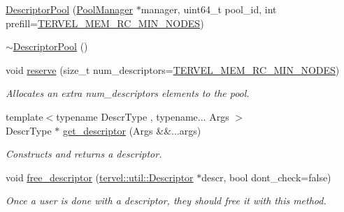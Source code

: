 \begin{DoxyCompactItemize}
\item 
\hyperlink{classtervel_1_1util_1_1memory_1_1rc_1_1_descriptor_pool_a552444bec208a324258ef830fa45597d}{Descriptor\+Pool} (\hyperlink{classtervel_1_1util_1_1memory_1_1rc_1_1_pool_manager}{Pool\+Manager} $\ast$manager, uint64\+\_\+t pool\+\_\+id, int prefill=\hyperlink{util_8h_afd0fad68cb3234a00478ba61d879a895}{T\+E\+R\+V\+E\+L\+\_\+\+M\+E\+M\+\_\+\+R\+C\+\_\+\+M\+I\+N\+\_\+\+N\+O\+D\+E\+S})
\item 
\hyperlink{classtervel_1_1util_1_1memory_1_1rc_1_1_descriptor_pool_ac3e88ac0469b52e803f4f1991611f72e}{$\sim$\+Descriptor\+Pool} ()
\item 
void \hyperlink{classtervel_1_1util_1_1memory_1_1rc_1_1_descriptor_pool_a6d086ae584f1ce4b23ec0f3040503c7d}{reserve} (size\+\_\+t num\+\_\+descriptors=\hyperlink{util_8h_afd0fad68cb3234a00478ba61d879a895}{T\+E\+R\+V\+E\+L\+\_\+\+M\+E\+M\+\_\+\+R\+C\+\_\+\+M\+I\+N\+\_\+\+N\+O\+D\+E\+S})
\begin{DoxyCompactList}\small\item\em Allocates an extra {\ttfamily num\+\_\+descriptors} elements to the pool. \end{DoxyCompactList}\item 
{\footnotesize template$<$typename Descr\+Type , typename... Args $>$ }\\Descr\+Type $\ast$ \hyperlink{classtervel_1_1util_1_1memory_1_1rc_1_1_descriptor_pool_aeba4dbb575d67e4c2425e1b15c4b3f11}{get\+\_\+descriptor} (Args \&\&...args)
\begin{DoxyCompactList}\small\item\em Constructs and returns a descriptor. \end{DoxyCompactList}\item 
void \hyperlink{classtervel_1_1util_1_1memory_1_1rc_1_1_descriptor_pool_aa81862471eea9aeed3b04ecc503b9197}{free\+\_\+descriptor} (\hyperlink{classtervel_1_1util_1_1_descriptor}{tervel\+::util\+::\+Descriptor} $\ast$descr, bool dont\+\_\+check=false)
\begin{DoxyCompactList}\small\item\em Once a user is done with a descriptor, they should free it with this method. \end{DoxyCompactList}\end{DoxyCompactItemize}
